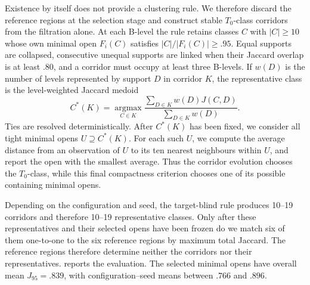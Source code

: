 \documentclass[a4paper,11pt]{article}
\theoremstyle{definition}
\theoremstyle{remark}
\begin{document}
Existence by itself does not provide a clustering rule. We therefore discard the reference regions at the selection stage and construct stable $T_0$-class corridors from the filtration alone. At each B-level the rule retains classes $C$ with $|C|\geq10$ whose own minimal open $F_i(C)$ satisfies $|C|/|F_i(C)|\geq .95$. Equal supports are collapsed, consecutive unequal supports are linked when their Jaccard overlap is at least $.80$, and a corridor must occupy at least three B-levels. If $w(D)$ is the number of levels represented by support $D$ in corridor $K$, the representative class is the level-weighted Jaccard medoid
$$
 C^*(K)=\operatorname*{argmax}_{C\in K}
 \frac{\sum_{D\in K}w(D)J(C,D)}{\sum_{D\in K}w(D)}.
$$
Ties are resolved deterministically. After $C^*(K)$ has been fixed, we consider all tight minimal opens $U\supseteq C^*(K)$. For each such $U$, we compute the average distance from
an observation of $U$ to its ten nearest neighbours within $U$, and report the open with the smallest average. Thus the corridor evolution chooses the $T_0$-class, while this final compactness criterion chooses one of its possible containing minimal opens.

Depending on the configuration and seed, the target-blind rule produces 10--19 corridors and therefore 10--19 representative classes. Only after these representatives and their selected opens have been frozen do we match six of them one-to-one to the six reference regions by maximum total Jaccard. The reference regions therefore determine neither the corridors nor their representatives.  reports the evaluation. The selected minimal opens have overall mean $J_{95}=.839$, with configuration--seed means between $.766$ and $.896$.
\end{document}
